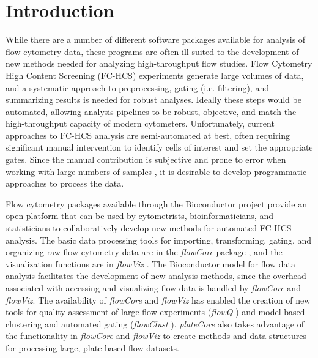 \documentclass[12pt]{article}
\newcommand{\Rpackage}[1]{{\textit{#1}}}
\begin{document}
\clearpage
\section*{Introduction}

While there are a number of different software packages available for analysis of flow cytometry data, these programs are often
ill-suited to the development of new methods needed for analyzing high-throughput flow studies.
Flow Cytometry High Content Screening (FC-HCS) experiments generate large volumes of data, and a systematic approach to
preprocessing, gating (i.e. filtering), and summarizing results is needed for robust analyses. 
Ideally these steps would be automated,
allowing analysis pipelines to be robust, objective, and match the high-throughput capacity of modern cytometers. 
Unfortunately, current approaches to FC-HCS analysis are semi-automated at best,
often requiring significant manual intervention to identify cells of interest and set the appropriate gates. 
Since the manual contribution is subjective and prone to error when working with large numbers of samples \citep{Maecker2005},
it is desirable to develop programmatic approaches to process the data.

Flow cytometry packages available through the Bioconductor \citep{BIOC} project provide an open platform that
can be used by cytometrists, bioinformaticians, and statisticians to collaboratively develop new methods for
automated FC-HCS analysis.  The basic data processing tools for importing, transforming, gating, and
organizing raw flow cytometry data are in the \Rpackage{flowCore} package \citep{hahne2009}, and the visualization functions are
in \Rpackage{flowViz} \citep{sarkar2008ufv}. The Bioconductor model for flow data analysis facilitates
the development of new analysis methods, since the overhead associated with
accessing and visualizing flow data is handled by \Rpackage{flowCore} and \Rpackage{flowViz}.
The availability of \Rpackage{flowCore} and \Rpackage{flowViz} has enabled the creation of new tools for
quality assessment of large flow experiments (\Rpackage{flowQ} \citep{}) and model-based clustering and automated gating
(\Rpackage{flowClust} \cite{lo2008agf}).
\Rpackage{plateCore} also takes advantage of the functionality in \Rpackage{flowCore} and \Rpackage{flowViz}
to create methods and data structures for processing large, plate-based flow datasets.  
\end{document}
